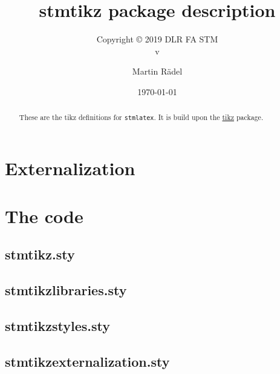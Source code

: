 \documentclass{scrartcl}
\author{Martin R\"{a}del}
\title{stmtikz package description}
\subtitle{Copyright \copyright{} 2019 DLR FA STM\\v\DTMsetdatestyle{versiondate}\DTMtoday}
\date{\today}
\begin{document}
\maketitle

\begin{abstract}
These are the tikz definitions for \texttt{stmlatex}. It is build upon the \href{https://ctan.org/pkg/tikz}{tikz} package.
\end{abstract}

\tableofcontents

\section{Externalization}

\begin{figure}
\centering
\tikzexternalenable
{}
\tikzexternaldisable
\end{figure}


\newpage
\appendix

\section{The code}

\subsection{stmtikz.sty}



\newpage
\subsection{stmtikzlibraries.sty}



\newpage
\subsection{stmtikzstyles.sty}



\newpage
\subsection{stmtikzexternalization.sty}


\end{document}
